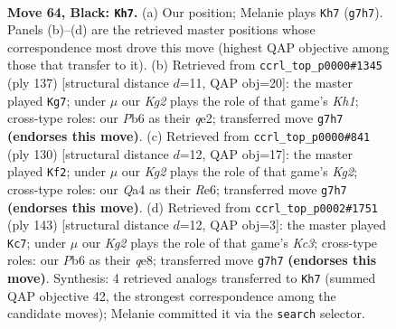 \documentclass[11pt]{article}
\begin{document}
\clearpage

\begin{figure}[p]\centering
\begin{subfigure}{0.46\textwidth}\centering
\resizebox{\linewidth}{!}{%
\newchessgame
\chessboard[
  setfen={8/p5k1/1p6/8/q1P5/3K4/8/8 b - - 1 64},
  showmover=false,
  pgfstyle=straightmove, color=movearrow, markmove={g7-h7}
]}
\caption{}
\end{subfigure}\hfill
\begin{subfigure}{0.46\textwidth}\centering
\resizebox{\linewidth}{!}{%
\newchessgame
\chessboard[
  setfen={7k/8/8/8/5q1p/8/4QP2/7K b - - 5 69},
  showmover=false,
  pgfstyle=straightmove, color=movearrow, markmove={h8-g7}
]}
\caption{}
\end{subfigure}
\\[4pt]
\begin{subfigure}{0.46\textwidth}\centering
\resizebox{\linewidth}{!}{%
\newchessgame
\chessboard[
  setfen={8/6k1/4R2p/8/5P2/6P1/6K1/r7 w - - 7 66},
  showmover=false,
  pgfstyle=straightmove, color=movearrow, markmove={g2-f2}
]}
\caption{}
\end{subfigure}\hfill
\begin{subfigure}{0.46\textwidth}\centering
\resizebox{\linewidth}{!}{%
\newchessgame
\chessboard[
  setfen={4Q3/8/2k5/8/1P3p2/8/3q4/K7 b - - 1 72},
  showmover=false,
  pgfstyle=straightmove, color=movearrow, markmove={c6-c7}
]}
\caption{}
\end{subfigure}
\caption{\textbf{Move 64, Black: \texttt{Kh7}.} (a) Our position; Melanie plays \texttt{Kh7} (\texttt{g7h7}). Panels (b)--(d) are the retrieved master positions whose correspondence most drove this move (highest QAP objective among those that transfer to it). (b) Retrieved from \texttt{ccrl\_top\_p0000\#1345} (ply 137) [structural distance $d$=11, QAP obj=20]: the master played \texttt{Kg7}; under $\mu$ our \emph{Kg2} plays the role of that game's \emph{Kh1}; cross-type roles: our \emph{P}b6 as their \emph{q}e2; transferred move \texttt{g7h7} \textbf{(endorses this move)}. (c) Retrieved from \texttt{ccrl\_top\_p0000\#841} (ply 130) [structural distance $d$=12, QAP obj=17]: the master played \texttt{Kf2}; under $\mu$ our \emph{Kg2} plays the role of that game's \emph{Kg2}; cross-type roles: our \emph{Q}a4 as their \emph{R}e6; transferred move \texttt{g7h7} \textbf{(endorses this move)}. (d) Retrieved from \texttt{ccrl\_top\_p0002\#1751} (ply 143) [structural distance $d$=12, QAP obj=3]: the master played \texttt{Kc7}; under $\mu$ our \emph{Kg2} plays the role of that game's \emph{Kc3}; cross-type roles: our \emph{P}b6 as their \emph{q}e8; transferred move \texttt{g7h7} \textbf{(endorses this move)}. Synthesis: 4 retrieved analogs transferred to \texttt{Kh7} (summed QAP objective 42, the strongest correspondence among the candidate moves); Melanie committed it via the \texttt{search} selector.}
\label{fig:thought-m127}
\end{figure}
\end{document}
